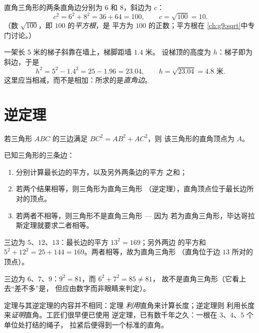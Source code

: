 \begin{example}[求斜边]\label{ex:g8:pythagoras:hypotenuse}
直角三角形的两条直角边分别为 $6$ 和 $8$，斜边为 $c$：
\[
c^2 = 6^2 + 8^2 = 36 + 64 = 100,
\qquad
c = \sqrt{100} = 10 .
\]
（数 $\sqrt{100}$，即 $100$ 的\emph{平方根}，是
平方为 $100$ 的正数；平方根在
\cref{ch:g9:sqrt}中专门讨论。）
\end{example}

\begin{example}[求直角边]\label{ex:g8:pythagoras:leg}
一架长 $5$ 米的梯子斜靠在墙上，梯脚距墙 $1.4$ 米。
设梯顶的高度为 $h$：梯子即为斜边，于是
\[
h^2 = 5^2 - 1.4^2 = 25 - 1.96 = 23.04,
\qquad
h = \sqrt{23.04} = 4.8 \text{ 米}.
\]
这里应当相减，而不是相加：所求的是\emph{直角边}。
\end{example}

\section{逆定理}

\begin{theorem}[毕达哥拉斯定理的逆定理]\label{thm:g8:pythagoras:converse}
若三角形 $ABC$ 的三边满足 $BC^2 = AB^2 + AC^2$，则
该三角形的直角顶点为 $A$。
\end{theorem}
\admitted

\begin{method}[判断直角三角形]\label{met:g8:pythagoras:test}
已知三角形的三条边：
\begin{enumerate}
  \item 分别计算最长边的平方，以及另外两条边的平方
        之和；
  \item 若两个结果相等，则三角形为直角三角形
        （逆定理），直角顶点位于最长边所对的顶点。
  \item 若两者不相等，则三角形不是直角三角形 --- 因为
        若为直角三角形，毕达哥拉斯定理就要求二者相等。
\end{enumerate}
\end{method}

\begin{example}\label{ex:g8:pythagoras:test}
三边为 $5$、$12$、$13$：最长边的平方 $13^2 = 169$；另外两边
的平方和 $5^2 + 12^2 = 25 + 144 = 169$。两者相等，故为直角三角形
（直角位于边 $13$ 所对的顶点）。

三边为 $6$、$7$、$9$：$9^2 = 81$，而 $6^2 + 7^2 = 85 \neq 81$，
故不是直角三角形（它看上去“差不多”是，
但应由数字而非眼睛来判定）。
\end{example}

\begin{remark}[定理与逆定理]
定理与其逆定理的内容并不相同：定理
\emph{利用}直角来计算长度；逆定理则
利用长度来\emph{证明}直角。工匠们很早便已使用
逆定理，已有数千年之久：一根在 $3$、$4$、$5$ 个单位处打结的绳子，
拉紧后便得到一个标准的直角。
\end{remark}

